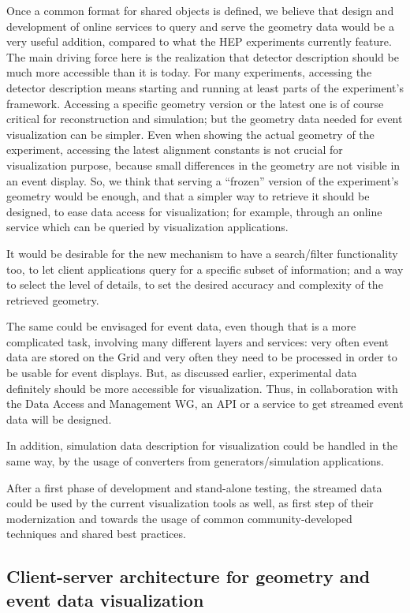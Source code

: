 \documentclass[12pt,a4paper]{article}
\begin{document}
Once a common format for shared objects is defined, we believe that design and development of online services to query and
serve the geometry data would be a very useful addition, compared to what the HEP experiments currently feature.
The main driving force here is the realization that detector description should be much more accessible than it is today. For many experiments,
accessing the detector description means starting and running at least parts of the experiment’s framework. Accessing a specific
geometry version or the latest one is of course critical for reconstruction and simulation; but the geometry data needed for
event visualization can be simpler. Even when showing the actual geometry of the experiment, accessing the latest alignment
constants is not crucial for visualization purpose, because small differences in the geometry are not visible in an event display.
So, we think that serving a “frozen” version of the experiment’s geometry would be enough, and that a simpler way to retrieve
it should be designed, to ease data access for visualization; for example, through an online service which can be queried by
visualization applications.

It would be desirable for the new mechanism to have a search/filter functionality too, to let client applications query
for a specific subset of information; and a way to select the level of details, to set the desired accuracy and complexity
of the retrieved geometry.

The same could be envisaged for event data, even though that is a more complicated task, involving many different layers and services:
very often event data are stored on the Grid and very often they need to be processed in order to be usable for event displays.
But, as discussed earlier, experimental data definitely should be more accessible for visualization. Thus, in collaboration with
the Data Access and Management WG, an API or a service to get streamed event data will be designed.

In addition, simulation data description for visualization could be handled in the same way, by the usage of converters from
generators/simulation applications.

After a first phase of development and stand-alone testing, the streamed data could be used by the current visualization tools
as well, as first step of their modernization and towards the usage of common community-developed techniques and shared best practices.

\hypertarget{client-server}{%
\subsection{Client-server architecture for geometry and event data visualization}\label{client-server}}
\end{document}
